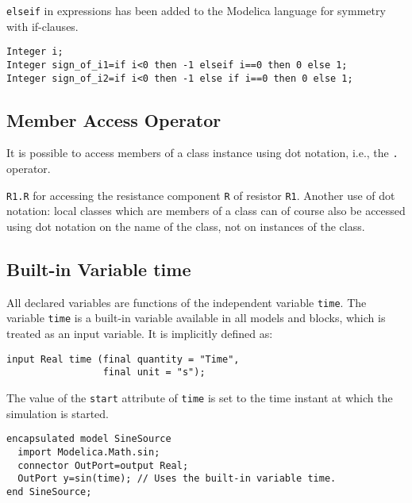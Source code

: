 \begin{nonnormative}
\lstinline!elseif! in expressions has been added to the Modelica language for symmetry with if-clauses.
\end{nonnormative}

\begin{example}
\begin{lstlisting}[language=modelica]
Integer i;
Integer sign_of_i1=if i<0 then -1 elseif i==0 then 0 else 1;
Integer sign_of_i2=if i<0 then -1 else if i==0 then 0 else 1;
\end{lstlisting}
\end{example}

\subsection{Member Access Operator}\label{member-access-operator}

It is possible to access members of a class instance using dot notation,
i.e., the \lstinline!.! operator.

\begin{example}
\lstinline!R1.R! for accessing the resistance component \lstinline!R!
of resistor \lstinline!R1!. Another use of dot notation: local classes
which are members of a class can of course also be accessed using dot
notation on the name of the class, not on instances of the class.
\end{example}

\subsection{Built-in Variable time}\label{built-in-variable-time}

All declared variables are functions of the independent variable \lstinline!time!.
The variable \lstinline!time! is a built-in variable available in all models and
blocks, which is treated as an input variable. It is implicitly defined
as:
\begin{lstlisting}[language=modelica]
input Real time (final quantity = "Time",
                 final unit = "s");
\end{lstlisting}

The value of the \lstinline!start! attribute of \lstinline!time! is set to the time instant at
which the simulation is started.

\begin{example}
\begin{lstlisting}[language=modelica]
encapsulated model SineSource
  import Modelica.Math.sin;
  connector OutPort=output Real;
  OutPort y=sin(time); // Uses the built-in variable time.
end SineSource;
\end{lstlisting}
\end{example}

